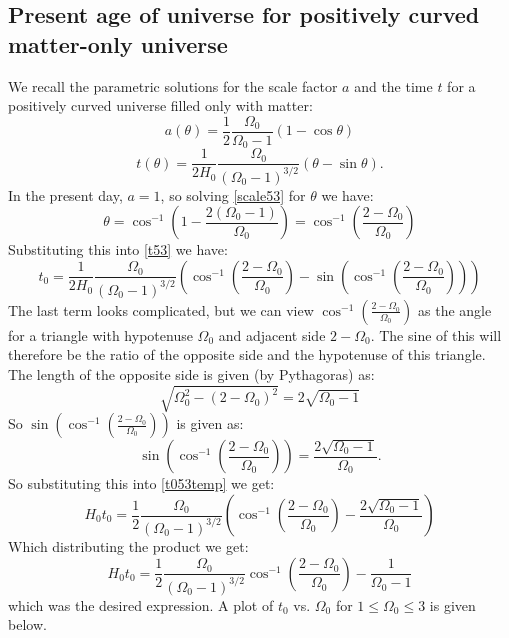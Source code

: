 \subsection{Present age of universe for positively curved matter-only universe}
We recall the parametric solutions for the scale factor $a$ and the time $t$ for a positively curved universe filled only with matter:
\begin{equation}\label{scale53}
    a(\theta) = \frac{1}{2}\frac{\Omega_0}{\Omega_0 - 1}(1 - \cos\theta)
\end{equation}
\begin{equation}\label{t53}
    t(\theta) = \frac{1}{2H_0}\frac{\Omega_0}{(\Omega_0 - 1)^{3/2}}(\theta - \sin\theta).
\end{equation}
In the present day, $a = 1$, so solving \eqref{scale53} for $\theta$ we have:
\begin{equation}
   \theta = \cos^{-1}\left(1 - \frac{2(\Omega_0 - 1)}{\Omega_0}\right) = \cos^{-1}\left(\frac{2 - \Omega_0}{\Omega_0}\right)
\end{equation}
Substituting this into \eqref{t53} we have:
\begin{equation}\label{t053temp}
    t_0 = \frac{1}{2H_0}\frac{\Omega_0}{(\Omega_0 - 1)^{3/2}}(\cos^{-1}\left(\frac{2 - \Omega_0}{\Omega_0}\right) - \sin(\cos^{-1}\left(\frac{2 - \Omega_0}{\Omega_0}\right)))
\end{equation}
The last term looks complicated, but we can view $\cos^{-1}\left(\frac{2 - \Omega_0}{\Omega_0}\right)$ as the angle for a triangle with hypotenuse $\Omega_0$ and adjacent side $2 - \Omega_0$. The sine of this will therefore be the ratio of the opposite side and the hypotenuse of this triangle. The length of the opposite side is given (by Pythagoras) as:
\begin{equation}
    \sqrt{\Omega_0^2 - (2 - \Omega_0)^2} = 2\sqrt{\Omega_0 - 1}
\end{equation}
So $\sin(\cos^{-1}\left(\frac{2 - \Omega_0}{\Omega_0}\right))$ is given as:
\begin{equation}
    \sin(\cos^{-1}\left(\frac{2 - \Omega_0}{\Omega_0}\right)) = \frac{2\sqrt{\Omega_0 - 1}}{\Omega_0}.
\end{equation}
So substituting this into \eqref{t053temp} we get:
\begin{equation}
    H_0t_0 = \frac{1}{2}\frac{\Omega_0}{(\Omega_0 - 1)^{3/2}}(\cos^{-1}\left(\frac{2 - \Omega_0}{\Omega_0}\right) - \frac{2\sqrt{\Omega_0 - 1}}{\Omega_0})
\end{equation}
Which distributing the product we get:
\begin{equation}
    \boxed{H_0t_0 = \frac{1}{2}\frac{\Omega_0}{(\Omega_0 - 1)^{3/2}}\cos^{-1}\left(\frac{2 - \Omega_0}{\Omega_0}\right) - \frac{1}{\Omega_0 - 1}}
\end{equation}
which was the desired expression. A plot of $t_0$ vs. $\Omega_0$ for $1 \leq \Omega_0 \leq 3$ is given below.

